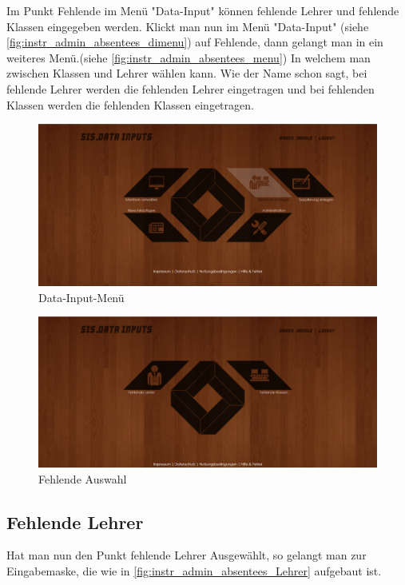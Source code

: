 Im Punkt Fehlende im Menü "Data-Input" können fehlende Lehrer und fehlende Klassen eingegeben werden. Klickt man nun im Menü "Data-Input" (siehe \autoref{fig:instr_admin_absentees_dimenu}) auf Fehlende, dann gelangt man in ein weiteres Menü.(siehe \autoref{fig:instr_admin_absentees_menu}) In welchem man zwischen Klassen und Lehrer wählen kann. Wie der Name schon sagt, bei fehlende Lehrer werden die fehlenden Lehrer eingetragen und bei fehlenden Klassen werden die fehlenden Klassen eingetragen.
\begin{figure}[H]
\centering
\includegraphics[keepaspectratio=true, width=14cm]{images/screenshots/data-inputs2.png}
\caption{Data-Input-Menü}
\label{fig:instr_admin_absentees_dimenu}
\end{figure}
\begin{figure}[H]
\centering
\includegraphics[keepaspectratio=true, width=14cm]{images/screenshots/data-inputs_fehlende.png}
\caption{Fehlende Auswahl}
\label{fig:instr_admin_absentees_menu}
\end{figure}
\subsection{Fehlende Lehrer}
Hat man nun den Punkt fehlende Lehrer Ausgewählt, so gelangt man zur Eingabemaske, die wie in \autoref{fig:instr_admin_absentees_Lehrer} aufgebaut ist.
